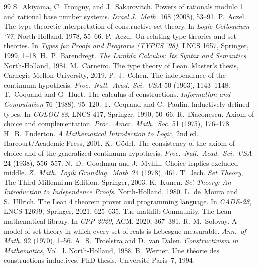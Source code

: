 \documentclass[11pt]{article}
\theoremstyle{definition}
\theoremstyle{plain}
\theoremstyle{remark}
\begin{document}
\begin{thebibliography}{99}
 S.~Akiyama, C.~Frougny, and J.~Sakarovitch. Powers of rationals modulo 1 and rational base number systems. \emph{Israel J.\ Math.} 168 (2008), 53--91.
 P.~Aczel. The type theoretic interpretation of constructive set theory. In \emph{Logic Colloquium '77}, North-Holland, 1978, 55--66.
 P.~Aczel. On relating type theories and set theories. In \emph{Types for Proofs and Programs (TYPES '98)}, LNCS 1657, Springer, 1999, 1--18.
 H.~P.~Barendregt. \emph{The Lambda Calculus: Its Syntax and Semantics}. North-Holland, 1984.
 M.~Carneiro. The type theory of Lean. Master's thesis, Carnegie Mellon University, 2019.
 P.~J.~Cohen. The independence of the continuum hypothesis. \emph{Proc.\ Natl.\ Acad.\ Sci.\ USA} 50 (1963), 1143--1148.
 T.~Coquand and G.~Huet. The calculus of constructions. \emph{Information and Computation} 76 (1988), 95--120.
 T.~Coquand and C.~Paulin. Inductively defined types. In \emph{COLOG-88}, LNCS 417, Springer, 1990, 50--66.
 R.~Diaconescu. Axiom of choice and complementation. \emph{Proc.\ Amer.\ Math.\ Soc.} 51 (1975), 176--178.
 H.~B.~Enderton. \emph{A Mathematical Introduction to Logic}, 2nd ed. Harcourt/Academic Press, 2001.
 K.~G\"odel. The consistency of the axiom of choice and of the generalized continuum hypothesis. \emph{Proc.\ Natl.\ Acad.\ Sci.\ USA} 24 (1938), 556--557.
 N.~D.~Goodman and J.~Myhill. Choice implies excluded middle. \emph{Z.\ Math.\ Logik Grundlag.\ Math.} 24 (1978), 461.
 T.~Jech. \emph{Set Theory}, The Third Millennium Edition. Springer, 2003.
 K.~Kunen. \emph{Set Theory: An Introduction to Independence Proofs}. North-Holland, 1980.
 L.~de~Moura and S.~Ullrich. The Lean 4 theorem prover and programming language. In \emph{CADE-28}, LNCS 12699, Springer, 2021, 625--635.
 The mathlib Community. The Lean mathematical library. In \emph{CPP 2020}, ACM, 2020, 367--381.
 R.~M.~Solovay. A model of set-theory in which every set of reals is Lebesgue measurable. \emph{Ann.\ of Math.} 92 (1970), 1--56.
 A.~S.~Troelstra and D.~van Dalen. \emph{Constructivism in Mathematics}, Vol.~I. North-Holland, 1988.
 B.~Werner. Une th\'eorie des constructions inductives. PhD thesis, Universit\'e Paris~7, 1994.

\end{thebibliography}
\end{document}

